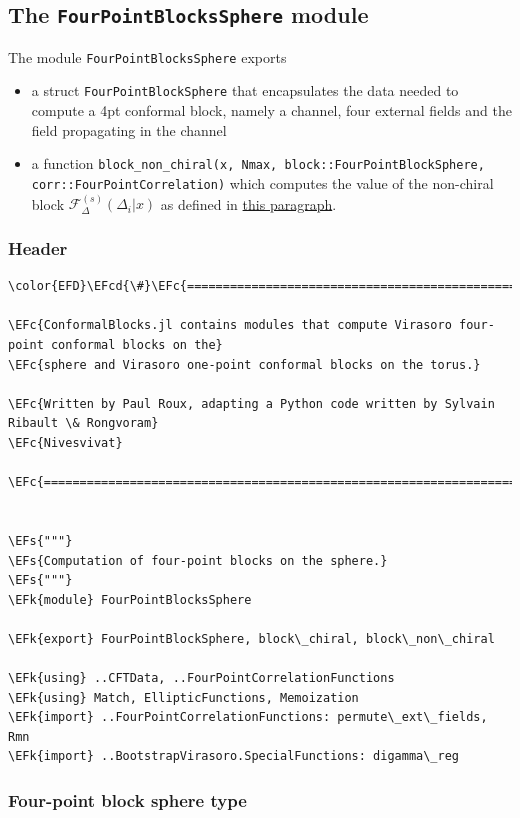\documentclass[a4paper]{article}
\numberwithin{equation}{section}
\newcommand{\EFc}[1]{\textcolor{EFc}{#1}} %
\newcommand{\EFcd}[1]{\textcolor{EFcd}{#1}} %
\newcommand{\EFs}[1]{\textcolor{EFs}{#1}} %
\newcommand{\EFk}[1]{\textcolor{EFk}{#1}} %
\begin{document}
\subsection{The \texttt{FourPointBlocksSphere} module}
\label{sec:orgded16e1}
The module \texttt{FourPointBlocksSphere} exports

\begin{itemize}
\item a struct \texttt{FourPointBlockSphere} that encapsulates the data needed to compute a 4pt conformal block, namely a channel, four external fields and the field propagating in the channel
\item a function \texttt{block\_non\_chiral(x, Nmax, block::FourPointBlockSphere, corr::FourPointCorrelation)} which computes the value of the non-chiral block \(\mathcal F_{\Delta}^{(s)}(\Delta_i | x)\) as defined in \hyperref[sec:orgab31910]{this paragraph}.
\end{itemize}
\subsubsection*{Header}
\label{sec:org914bb1e}

\begin{Code}
\begin{Verbatim}
\color{EFD}\EFcd{\#}\EFc{===========================================================================================}

\EFc{ConformalBlocks.jl contains modules that compute Virasoro four-point conformal blocks on the}
\EFc{sphere and Virasoro one-point conformal blocks on the torus.}

\EFc{Written by Paul Roux, adapting a Python code written by Sylvain Ribault \& Rongvoram}
\EFc{Nivesvivat}

\EFc{===========================================================================================\#}


\EFs{"""}
\EFs{Computation of four-point blocks on the sphere.}
\EFs{"""}
\EFk{module} FourPointBlocksSphere

\EFk{export} FourPointBlockSphere, block\_chiral, block\_non\_chiral

\EFk{using} ..CFTData, ..FourPointCorrelationFunctions
\EFk{using} Match, EllipticFunctions, Memoization
\EFk{import} ..FourPointCorrelationFunctions: permute\_ext\_fields, Rmn
\EFk{import} ..BootstrapVirasoro.SpecialFunctions: digamma\_reg
\end{Verbatim}
\end{Code}
\subsubsection*{Four-point block sphere type}
\label{sec:org2e06355}
\end{document}
